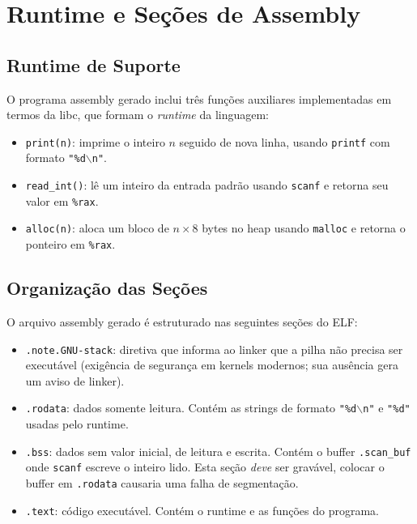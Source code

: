 \section{Runtime e Seções de Assembly}

\subsection{Runtime de Suporte}

O programa assembly gerado inclui três funções auxiliares implementadas em
termos da libc, que formam o \emph{runtime} da linguagem:

\begin{itemize}
  \item \texttt{print(n)}: imprime o inteiro $n$ seguido de nova linha,
    usando \texttt{printf} com formato \texttt{"\%d$\backslash$n"}.
  \item \texttt{read\_int()}: lê um inteiro da entrada padrão usando
    \texttt{scanf} e retorna seu valor em \texttt{\%rax}.
  \item \texttt{alloc(n)}: aloca um bloco de $n \times 8$ bytes no heap
    usando \texttt{malloc} e retorna o ponteiro em \texttt{\%rax}.
\end{itemize}

\subsection{Organização das Seções}

O arquivo assembly gerado é estruturado nas seguintes seções do ELF:

\begin{itemize}
  \item \texttt{.note.GNU-stack}: diretiva que informa ao linker que a
    pilha não precisa ser executável (exigência de segurança em kernels
    modernos; sua ausência gera um aviso de linker).
  \item \texttt{.rodata}: dados somente leitura. Contém as strings de
    formato \texttt{"\%d$\backslash$n"} e \texttt{"\%d"} usadas pelo runtime.
  \item \texttt{.bss}: dados sem valor inicial, de leitura e escrita.
    Contém o buffer \texttt{.scan\_buf} onde \texttt{scanf} escreve o
    inteiro lido. Esta seção \emph{deve} ser gravável, colocar o buffer
    em \texttt{.rodata} causaria uma falha de segmentação.
  \item \texttt{.text}: código executável. Contém o runtime e as funções
    do programa.
\end{itemize}

